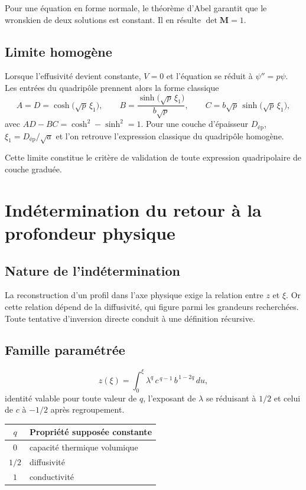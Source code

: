 \documentclass[11pt,a4paper]{article}
\begin{document}
Pour une équation en forme normale, le théorème d'Abel garantit que le wronskien de deux solutions est
constant. Il en résulte $\det\mathbf{M} = 1$.

\subsection{Limite homogène}

Lorsque l'effusivité devient constante, $V = 0$ et l'équation se réduit à $\psi'' = p\psi$. Les entrées
du quadripôle prennent alors la forme classique
\[ A = D = \cosh\bigl(\sqrt{p}\,\xi_{1}\bigr) ,
\qquad
B = \frac{\sinh\bigl(\sqrt{p}\,\xi_{1}\bigr)}{b\sqrt{p}} ,
\qquad
C = b\sqrt{p}\,\sinh\bigl(\sqrt{p}\,\xi_{1}\bigr) , \]
avec $AD - BC = \cosh^{2} - \sinh^{2} = 1$. Pour une couche d'épaisseur $D_{\text{ép}}$,
$\xi_{1} = D_{\text{ép}}/\sqrt{a}$ et l'on retrouve l'expression classique du quadripôle homogène.

Cette limite constitue le critère de validation de toute expression quadripolaire de couche graduée.

\section{Indétermination du retour à la profondeur physique}

\subsection{Nature de l'indétermination}

La reconstruction d'un profil dans l'axe physique exige la relation entre $z$ et $\xi$. Or cette
relation dépend de la diffusivité, qui figure parmi les grandeurs recherchées. Toute tentative
d'inversion directe conduit à une définition récursive.

\subsection{Famille paramétrée}

\[ z(\xi) = \int_{0}^{\xi} \lambda^{q}\, c^{\,q-1}\, b^{\,1-2q}\, du , \]
identité valable pour toute valeur de $q$, l'exposant de $\lambda$ se réduisant à $1/2$ et celui de $c$
à $-1/2$ après regroupement.

\begin{center}
\begin{tabular}{@{}cl@{}}
\toprule
$q$ & Propriété supposée constante \\
\midrule
$0$ & capacité thermique volumique \\
$1/2$ & diffusivité \\
$1$ & conductivité \\
\bottomrule
\end{tabular}
\end{center}
\end{document}
